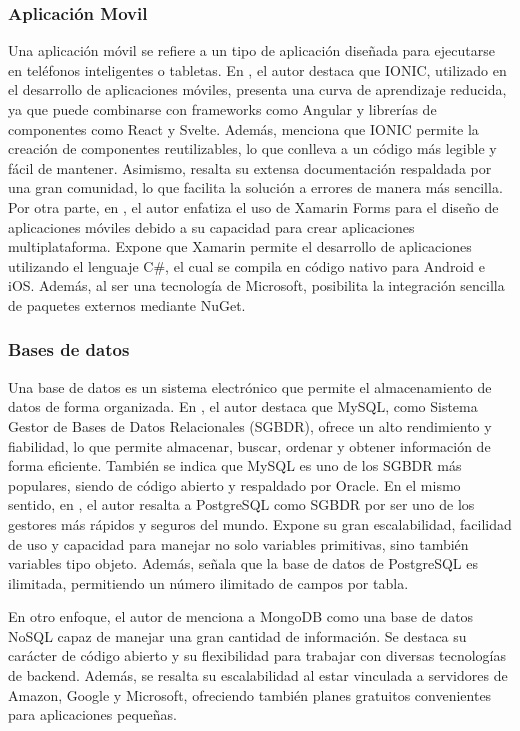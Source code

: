 \subsubsection{Aplicación Movil}
Una aplicación móvil se refiere a un tipo de aplicación diseñada para ejecutarse en teléfonos inteligentes o tabletas.
En \cite{chasichangoAplicacionMovilApoyo2022}, el autor destaca que IONIC, utilizado en el desarrollo de aplicaciones
móviles, presenta una curva de aprendizaje reducida, ya que puede combinarse con frameworks como Angular y librerías de
componentes como React y Svelte. Además, menciona que IONIC permite la creación de componentes reutilizables, lo que conlleva
a un código más legible y fácil de mantener. Asimismo, resalta su extensa documentación respaldada por una gran comunidad,
lo que facilita la solución a errores de manera más sencilla. Por otra parte, en \cite{lesanoperezAplicativoMovilGeoubicacion2022},
el autor enfatiza el uso de Xamarin Forms para el diseño de aplicaciones móviles debido a su capacidad para crear aplicaciones
multiplataforma. Expone que Xamarin permite el desarrollo de aplicaciones utilizando el lenguaje C\#, el cual se compila en
código nativo para Android e iOS. Además, al ser una tecnología de Microsoft, posibilita la integración sencilla de paquetes
externos mediante NuGet.

\subsubsection{Bases de datos}
Una base de datos es un sistema electrónico que permite el almacenamiento de datos de forma organizada.
En \cite{chicaizavillegasAplicacionWebPara2023}, el autor destaca que MySQL, como Sistema Gestor de Bases de Datos Relacionales
(SGBDR), ofrece un alto rendimiento y fiabilidad, lo que permite almacenar, buscar, ordenar y obtener información de forma eficiente.
También se indica que MySQL es uno de los SGBDR más populares, siendo de
código abierto y respaldado por Oracle. En el mismo sentido, en \cite{lesanoperezAplicativoMovilGeoubicacion2022}, el autor
resalta a PostgreSQL como SGBDR por ser uno de los gestores más rápidos y seguros del mundo. Expone su gran escalabilidad,
facilidad de uso y capacidad para manejar no solo variables primitivas, sino también variables tipo objeto. Además, señala que
la base de datos de PostgreSQL es ilimitada, permitiendo un número ilimitado de campos por tabla.

\bigbreak
En otro enfoque, el autor de \cite{chasichangoAplicacionMovilApoyo2022} menciona a MongoDB como una base de datos NoSQL capaz
de manejar una gran cantidad de información. Se destaca su carácter de código abierto y su flexibilidad para trabajar con
diversas tecnologías de backend. Además, se resalta su escalabilidad al estar vinculada a servidores de Amazon, Google y
Microsoft, ofreciendo también planes gratuitos convenientes para aplicaciones pequeñas.

